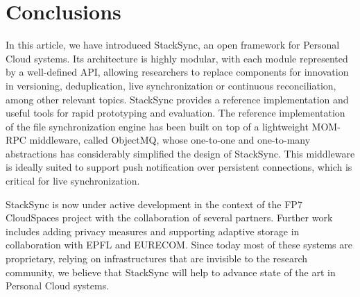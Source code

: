 \chapter{Conclusions}

In this article, we have introduced StackSync, an open framework for Personal Cloud systems.
Its architecture is highly modular, with each module represented by a well-defined API,
allowing researchers to replace components for innovation in versioning,
deduplication, live synchronization or continuous reconciliation, among other relevant topics. 
StackSync provides a reference implementation and useful tools for rapid prototyping and evaluation. 
The reference implementation of the file synchronization engine has been built
on top of a lightweight MOM-RPC middleware, called ObjectMQ, whose one-to-one and one-to-many
abstractions has considerably simplified the design of StackSync. This middleware is ideally
suited to support push notification over persistent connections,
which is critical for live synchronization.  

StackSync is now under active development in the context of the FP7 CloudSpaces project
with the collaboration of several partners. Further work includes adding privacy measures and
supporting adaptive storage in collaboration with EPFL and EURECOM. 
Since today most of these systems are proprietary, relying on infrastructures that are
invisible to the research community, we believe that StackSync will help to advance state
of the art in Personal Cloud systems.